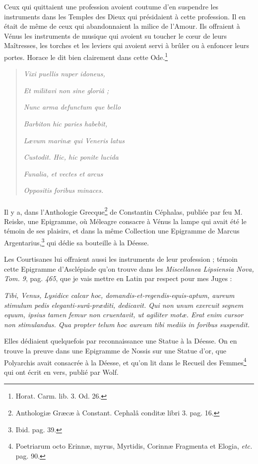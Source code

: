 \documentclass[a4paper, 11pt, oneside, polutonikogreek, french]{article}
\begin{document}
Ceux qui quittaient une profession avoient coutume d'en suspendre les instruments dans les Temples des Dieux qui présidaient à cette profession. Il en était de même de ceux qui abandonnaient la milice de l'Amour. Ils offraient à Vénus les instruments de musique qui avoient su toucher le cœur de leurs Maîtresses, les torches et les leviers qui avoient servi à brûler ou à enfoncer leurs portes. Horace le dit bien clairement dans cette Ode.\footnote{Horat. Carm. lib. 3. Od. 26.}
\begin{quotation}
\emph{Vixi puellis nuper idoneus,}

\emph{Et militavi non sine gloriâ ;}

\emph{Nunc arma defunctum que bello}

\emph{Barbiton hic paries habebit,}

\emph{Lævum marinæ qui Veneris latus}

\emph{Custodit. Hic, hic ponite lucida}

\emph{Funalia, et vectes et arcus}

\emph{Oppositis foribus minaces.}
\end{quotation}
\paragraph{}
Il y a, dans l'Anthologie Grecque\footnote{Anthologiæ Græcæ à Constant. Cephalâ conditæ libri 3. pag. 16.} de Constantin Céphalas, publiée par feu M. Reiske, une Epigramme, où Méleagre consacre à Vénus la lampe qui avait été le témoin de ses plaisirs, et dans la même Collection une Epigramme de Marcus Argentarius,\footnote{Ibid. pag. 39.} qui dédie sa bouteille à la Déesse.

Les Courtisanes lui offraient aussi les instruments de leur profession ; témoin cette Epigramme d'Asclépiade qu'on trouve dans les \emph{Miscellanea Lipsiensia Nova, Tom. 9}, pag. \emph{465}, que je vais mettre en Latin par respect pour mes Juges :

\emph{Tibi, Venus, Lysidice calcar hoc, domandis-et-regendis-equis-aptum, aureum stimulum pedis eleganti-surâ-præditi, dedicavit. Qui non unum exercuit segnem equum, ipsius tamen femur non cruentavit, ut agiliter motæ. Erat enim cursor non stimulandus. Qua propter telum hoc aureum tibi mediis in foribus suspendit.}

Elles dédiaient quelquefois par reconnaissance une Statue à la Déesse. On en trouve la preuve dans une Epigramme de Nossis sur une Statue d'or, que Polyarchis avait consacrée à la Déesse, et qu'on lit dans le Recueil des Femmes\footnote{Poetriarum octo Erinnæ, myrus, Myrtidis, Corinnæ Fragmenta et Elogia, \emph{etc.} pag. 90.} qui ont écrit en vers, publié par Wolf.
\end{document}
